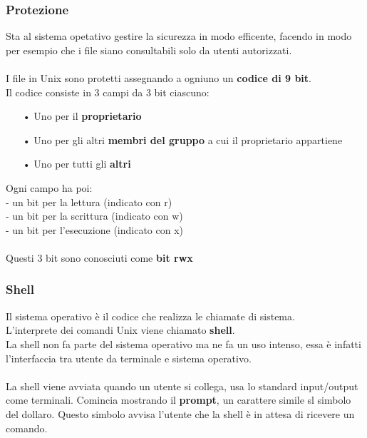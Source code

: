 \documentclass{article}
\begin{document}
\subsubsection{Protezione}
Sta al sistema opetativo gestire la sicurezza in modo efficente, facendo in modo per esempio che i file siano consultabili solo 
da utenti autorizzati.
\\
\\
I file in Unix sono protetti assegnando a ogniuno un \textbf{codice di 9 bit}.
\\Il codice consiste in 3 campi da 3 bit ciascuno:
\begin{enumerate}
   \item[•] Uno per il \textbf{proprietario}
   \item[•] Uno per gli altri \textbf{membri del gruppo} a cui il proprietario appartiene 
   \item[•] Uno per tutti gli \textbf{altri}
\end{enumerate}
Ogni campo ha poi:
\\- un bit per la lettura (indicato con r)
\\- un bit per la scrittura (indicato con w)
\\- un bit per l'esecuzione (indicato con x)
\\
\\Questi 3 bit sono conosciuti come \textbf{bit rwx}

\subsubsection{Shell}
Il sistema operativo è il codice che realizza le chiamate di sistema.
\\L'interprete dei comandi Unix viene chiamato \textbf{shell}. 
\\La shell non fa parte del sistema operativo ma ne fa un uso intenso, essa è infatti 
l'interfaccia tra utente da terminale e sistema operativo. \\
\\
La shell viene avviata quando un utente si collega, usa lo standard input/output come 
terminali. Comincia mostrando il \textbf{prompt}, un carattere simile sl simbolo del dollaro. Questo simbolo avvisa 
l'utente che la shell è in attesa di ricevere un comando.

\newpage
\end{document}
